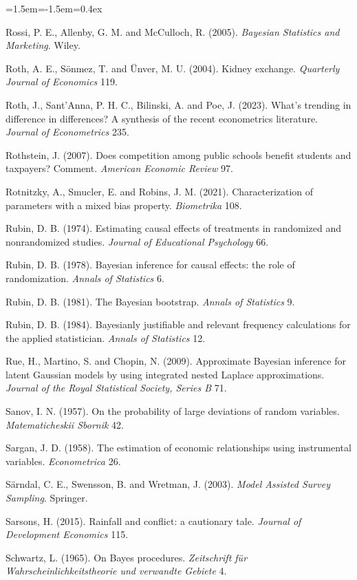 \begin{list}{}{\leftmargin=1.5em\itemindent=-1.5em\itemsep=0.4ex}
\item Rossi, P. E., Allenby, G. M. and McCulloch, R. (2005). \emph{Bayesian Statistics and Marketing}. Wiley.
\item Roth, A. E., S\"onmez, T. and \"Unver, M. U. (2004). Kidney exchange. \emph{Quarterly Journal of Economics} 119.
\item Roth, J., Sant'Anna, P. H. C., Bilinski, A. and Poe, J. (2023). What's trending in difference in differences? A synthesis of the recent econometrics literature. \emph{Journal of Econometrics} 235.
\item Rothstein, J. (2007). Does competition among public schools benefit students and taxpayers? Comment. \emph{American Economic Review} 97.
\item Rotnitzky, A., Smucler, E. and Robins, J. M. (2021). Characterization of parameters with a mixed bias property. \emph{Biometrika} 108.
\item Rubin, D. B. (1974). Estimating causal effects of treatments in randomized and nonrandomized studies. \emph{Journal of Educational Psychology} 66.
\item Rubin, D. B. (1978). Bayesian inference for causal effects: the role of randomization. \emph{Annals of Statistics} 6.
\item Rubin, D. B. (1981). The Bayesian bootstrap. \emph{Annals of Statistics} 9.
\item Rubin, D. B. (1984). Bayesianly justifiable and relevant frequency calculations for the applied statistician. \emph{Annals of Statistics} 12.
\item Rue, H., Martino, S. and Chopin, N. (2009). Approximate Bayesian inference for latent Gaussian models by using integrated nested Laplace approximations. \emph{Journal of the Royal Statistical Society, Series B} 71.
\item Sanov, I. N. (1957). On the probability of large deviations of random variables. \emph{Matematicheskii Sbornik} 42.
\item Sargan, J. D. (1958). The estimation of economic relationships using instrumental variables. \emph{Econometrica} 26.
\item S\"arndal, C. E., Swensson, B. and Wretman, J. (2003). \emph{Model Assisted Survey Sampling}. Springer.
\item Sarsons, H. (2015). Rainfall and conflict: a cautionary tale. \emph{Journal of Development Economics} 115.
\item Schwartz, L. (1965). On Bayes procedures. \emph{Zeitschrift f\"ur Wahrscheinlichkeitstheorie und verwandte Gebiete} 4.

\end{list}
